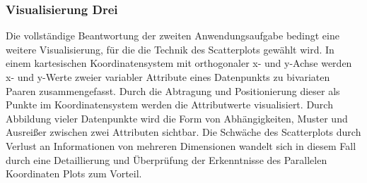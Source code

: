 \documentclass[usegeometry=true]{scrartcl}
\begin{document}




\subsubsection{Visualisierung Drei}
Die vollständige Beantwortung der zweiten Anwendungsaufgabe bedingt eine weitere Visualisierung, für die die Technik des Scatterplots gewählt wird.
In einem kartesischen Koordinatensystem mit orthogonaler x- und y-Achse werden x- und y-Werte zweier variabler Attribute eines Datenpunkts zu bivariaten Paaren zusammengefasst.
Durch die Abtragung und Positionierung dieser als Punkte im Koordinatensystem werden die Attributwerte visualisiert.\cite[103]{Friendly.2005}
Durch Abbildung vieler Datenpunkte wird die Form von Abhängigkeiten, Muster und Ausreißer zwischen zwei Attributen sichtbar.\cite[9]{Chan.2006} \cite[103]{Friendly.2005}
Die Schwäche des Scatterplots durch Verlust an Informationen von mehreren Dimensionen wandelt sich in diesem Fall durch eine Detaillierung und Überprüfung der Erkenntnisse des Parallelen Koordinaten Plots zum Vorteil.\cite[9]{Chan.2006} \cite[93]{Wegman.1997}
\end{document}
